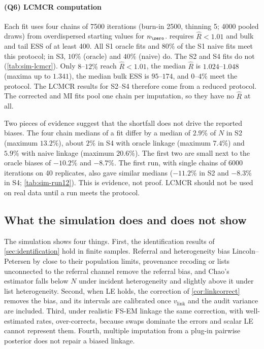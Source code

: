 \paragraph{(Q6) LCMCR computation} Each fit uses four chains of 7500 iterations (burn-in 2500, thinning 5; 4000 pooled draws) from overdispersed starting values for $n_{\zero}$.  requires $\widehat R<1.01$ and bulk and tail ESS of at least 400. All S1 oracle fits and $80\%$ of the S1 naive fits meet this protocol; in S3, $10\%$ (oracle) and $40\%$ (naive) do. The S2 and S4 fits do not (\cref{tab:sim-lcmcr}). Only $8$--$12\%$ reach $\widehat R<1.01$, the median $\widehat R$ is $1.024$--$1.048$ (maxima up to $1.341$), the median bulk ESS is $95$--$174$, and $0$--$4\%$ meet the protocol. The LCMCR results for S2--S4 therefore come from a reduced protocol. The corrected and MI fits pool one chain per imputation, so they have no $\widehat R$ at all.

Two pieces of evidence suggest that the shortfall does not drive the reported biases. The four chain medians of a fit differ by a median of $2.9\%$ of $N$ in S2 (maximum $13.2\%$), about $2\%$ in S4 with oracle linkage (maximum $7.4\%$) and $5.9\%$ with naive linkage (maximum $20.6\%$). The first two are small next to the oracle biases of $-10.2\%$ and $-8.7\%$. The first run, with single chains of 6000 iterations on 40 replicates, also gave similar medians ($-11.2\%$ in S2 and $-8.3\%$ in S4; \cref{tab:sim-run12}). This is evidence, not proof. LCMCR should not be used on real data until a run meets the protocol.

\subsection{What the simulation does and does not show}\label{sec:sim-scope}

The simulation shows four things. First, the identification results of \cref{sec:identification} hold in finite samples. Referral and heterogeneity bias Lincoln--Petersen by close to their population limits, provenance recoding or lists unconnected to the referral channel remove the referral bias, and Chao's estimator falls below $N$ under incident heterogeneity and slightly above it under list heterogeneity. Second, when LE holds, the correction of \cref{cor:linkcorrect} removes the bias, and its intervals are calibrated once $v_{\mathrm{link}}$ and the audit variance are included. Third, under realistic FS-EM linkage the same correction, with well-estimated rates, over-corrects, because swaps dominate the errors and scalar LE cannot represent them. Fourth, multiple imputation from a plug-in pairwise posterior does not repair a biased linkage.

